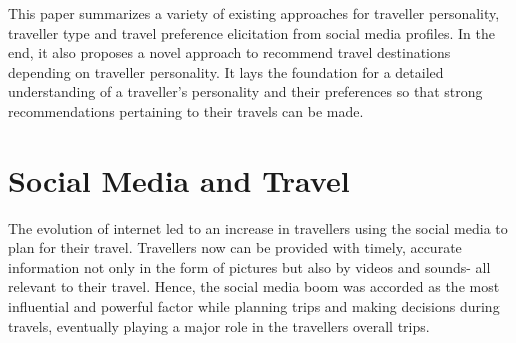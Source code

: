
This paper summarizes a variety of existing approaches for traveller personality, traveller type and travel preference elicitation from social media profiles. In the end, it also proposes a novel approach to recommend travel destinations depending on traveller personality. It lays the foundation for a detailed understanding of a traveller's personality and their preferences so that strong recommendations pertaining to their travels can be made. 








\section{Social Media and Travel}\label{1}

The evolution of internet led to an increase in travellers using the social media to plan for their travel. Travellers now can be provided with timely, accurate information not only in the form of pictures but also by videos and sounds- all relevant to their travel. Hence, the social media boom was accorded as the most influential and powerful factor while planning trips and making decisions during travels, eventually playing a major role in the traveller\textquotesingle s overall trips.

